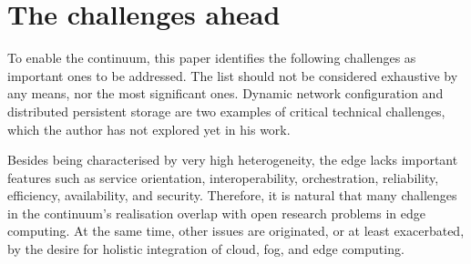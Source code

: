 \section{The challenges ahead}
\label{sec:challenges}


To enable the continuum, this paper identifies the following challenges as important ones to be addressed. The list should not be considered exhaustive by any means, nor the most significant ones. Dynamic network configuration and distributed persistent storage are two examples of critical technical challenges, which the author has not explored yet in his work.

Besides being characterised by very high heterogeneity, the edge lacks important features such as service orientation, interoperability, orchestration, reliability, efficiency, availability, and security. Therefore, it is natural that many challenges in the continuum's realisation overlap with open research problems in edge computing. At the same time, other issues are originated, or at least exacerbated, by the desire for holistic integration of cloud, fog, and edge computing.

